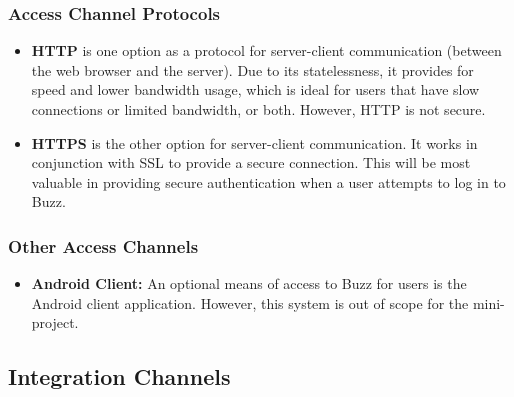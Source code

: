 \documentclass[11pt]{article}
\begin{document}
	\subsubsection{Access Channel Protocols}
	\begin{itemize}
	\item
	\textbf{HTTP} is one option as a protocol for server-client communication (between the web browser and the server). Due to its statelessness, it provides for speed and lower bandwidth usage, which is ideal for users that have slow connections or limited bandwidth, or both. However, HTTP is not secure. 
	\item\textbf{HTTPS} is the other option for server-client communication. It works in conjunction with SSL to provide a secure connection. This will be most valuable in providing secure authentication when a user attempts to log in to Buzz. 
	\end{itemize}
	
	\subsubsection{Other Access Channels}
	\begin{itemize}
	\item
	\textbf{Android Client:} An optional means of access to Buzz for users is the Android client application. However, this system is out of scope for the mini-project.
	\end{itemize}
		
	\subsection{\textbf{\huge{Integration Channels}}}
	
\end{document}
